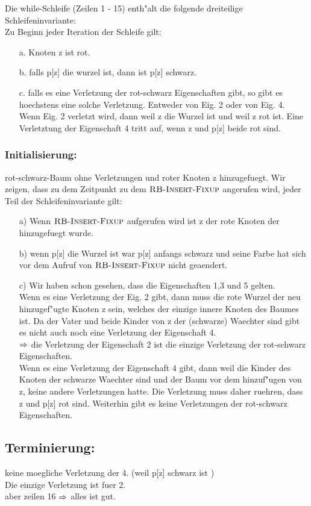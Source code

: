 \documentclass[a4paper]{scrartcl}
\begin{document}
Die while-Schleife (Zeilen 1 - 15) enth"alt die folgende dreiteilige Schleifeninvariante:\\
Zu Beginn jeder Iteration der Schleife gilt:
\begin{itemize}
\item[a.] Knoten z ist rot.
\item[b.] falls p[z] die wurzel ist, dann ist p[z] schwarz.
\item[c.] falls es eine Verletzung der rot-schwarz Eigenschaften gibt, so gibt es hoechstens eine solche Verletzung. Entweder von Eig. 2 oder von Eig. 4. Wenn Eig. 2 verletzt wird, dann weil z die Wurzel ist und weil z rot ist. Eine Verletztung der Eigenschaft 4 tritt auf, wenn z und p[z] beide rot sind. 
\end{itemize}


\subsubsection*{Initialisierung: }
rot-schwarz-Baum ohne Verletzungen und roter Knoten z hinzugefuegt. 
Wir zeigen, dass zu dem Zeitpunkt zu dem $\textnormal{\scshape RB-Insert-Fixup}$ angerufen wird, jeder Teil der Schleifeninvariante gilt:
\begin{itemize}
\item[a)] Wenn $\textnormal{\scshape RB-Insert-Fixup}$ aufgerufen wird ist z der rote Knoten der hinzugefuegt wurde.
\item[b)] wenn p[z] die Wurzel ist war p[z] anfangs schwarz und seine Farbe hat sich vor dem Aufruf von $\textnormal{\scshape RB-Insert-Fixup}$ nicht geaendert.
\item[c)] Wir haben schon gesehen, dass die Eigenschaften 1,3 und 5 gelten.\\
	Wenn es eine Verletzung der Eig. 2 gibt, dann muss die rote Wurzel der neu hinzugef"ugte Knoten z sein, welches der einzige innere Knoten des Baumes ist. Da der Vater und beide Kinder von z der (schwarze) Waechter sind gibt es nicht auch noch eine Verletzung der Eigenschaft 4. \\ $\Rightarrow$ die Verletzung der Eigenschaft 2 ist die einzige Verletzung der rot-schwarz Eigenschaften. \\
Wenn es eine Verletzung der Eigenschaft 4 gibt, dann weil  die Kinder des Knoten der schwarze Waechter sind und der Baum vor dem hinzuf"ugen von z, keine andere Verletzungen hatte. Die Verletzung muss daher ruehren, dass z und p[z] rot sind. Weiterhin gibt es keine Verletzungen der rot-schwarz Eigenschaften.
\end{itemize}
\subsection*{Terminierung: }
keine moegliche Verletzung der 4. (weil p[z] schwarz ist )\\
Die einzige Verletzung ist fuer 2.\\
aber zeilen 16 $\Rightarrow$ alles ist gut.\\
\end{document}
